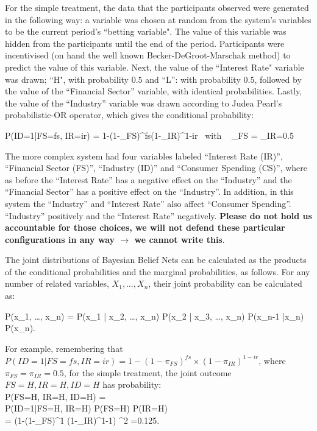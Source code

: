 For the simple treatment, the data that the participants observed were generated in the following way: a variable was chosen at random from the system's variables to be the current period's ``betting variable". The value of this variable was hidden from the participants until the end of the period. Participants were incentivised (on hand the well known Becker-DeGroot-Marschak method) to predict the value of this variable. Next, the value of the ``Interest Rate" variable was drawn; ``H", with probability $0.5$ and ``L'': with probability $0.5$, followed by the value of the ``Financial Sector'' variable, with identical probabilities. Lastly, the value of the ``Industry'' variable was drawn according to Judea Pearl's \citep{Pearl88} probabilistic-OR operator, which gives the conditional probability:  

\be
P(ID=1|FS=fs, IR=ir) = 1-(1-\pi_{FS})^{fs}(1-\pi_{IR})^{1-ir} ~with ~ \pi_{FS} = \pi_{IR}=0.5
\ee

The more complex system had four variables labeled ``Interest Rate (IR)'', ``Financial Sector (FS)'', ``Industry (ID)'' and ``Consumer Spending (CS)'', where as before the ``Interest Rate'' has a negative effect on the ``Industry'' and the ``Financial Sector'' has a positive effect on the ``Industry''. In addition, in this system the ``Industry'' and ``Interest Rate'' also affect ``Consumer Spending''. ``Industry'' positively and the ``Interest Rate'' negatively.  {\bf Please do not hold us accountable for those choices, we will not defend these particular configurations in any way $\rightarrow$  we cannot write this}.

The joint distributions of Bayesian Belief Nets can be calculated as the products of the conditional probabilities and the marginal probabilities, as follows. For any number of related variables, $X_1, \ldots, X_n$, their joint probability can be calculated as:

\be
P(x_1, \ldots, x_n) = P(x_1 | x_2, \ldots, x_n) \times P(x_2 | x_3, \ldots, x_n) \times \cdots \times P(x_{n-1} |x_n) \times P(x_n).
\ee

For example, remembering that $P(ID=1|FS=fs, IR=ir) = 1-(1-\pi_{FS})^{fs} \times (1-\pi_{IR})^{1-ir}$, where $\pi_{FS}=\pi_{IR}=0.5$, for 
the simple treatment, the joint outcome $FS=H, IR=H, ID=H$ has probability:\\

\ba
P(FS=H, IR=H, ID=H) =\\ 
P(ID=1|FS=H, IR=H) \times P(FS=H) \times P(IR=H) \\
=  \left(1-(1-\pi_{FS})^{1} \times (1-\pi_{IR})^{1-1}\right) ^2 =0.125.  
\ea

